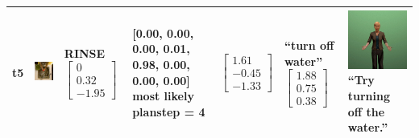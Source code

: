 \begin{longtable}{| V{0.8cm} | V{2.6cm} | V{1.6cm} | V{2.1cm} | V{1.55cm} | V{1.6cm} | V{3.2cm} |}
t5 &
\includegraphics[width=\linewidth]{fig/system/_slow2-rinse2_.jpg} &
RINSE
\linebreak\linebreak
$\begin{bmatrix}
0 \\
0.32 \\
-1.95
\end{bmatrix}$ &
[0.00, 0.00, 0.00, 0.01, 0.98, 0.00, 0.00, 0.00] most likely planstep = 4 &
$\begin{bmatrix}
1.61 \\
-0.45 \\
-1.33
\end{bmatrix}$ &
``turn off water''
\linebreak\linebreak
$\begin{bmatrix}
1.88 \\
0.75 \\
0.38
\end{bmatrix}$ &
\includegraphics[width=2.6cm]{fig/prompt/_try-turning-off-the-water_.jpg}
\linebreak
\footnotesize
``Try turning off the water.''
\\ \hline




\end{longtable}
